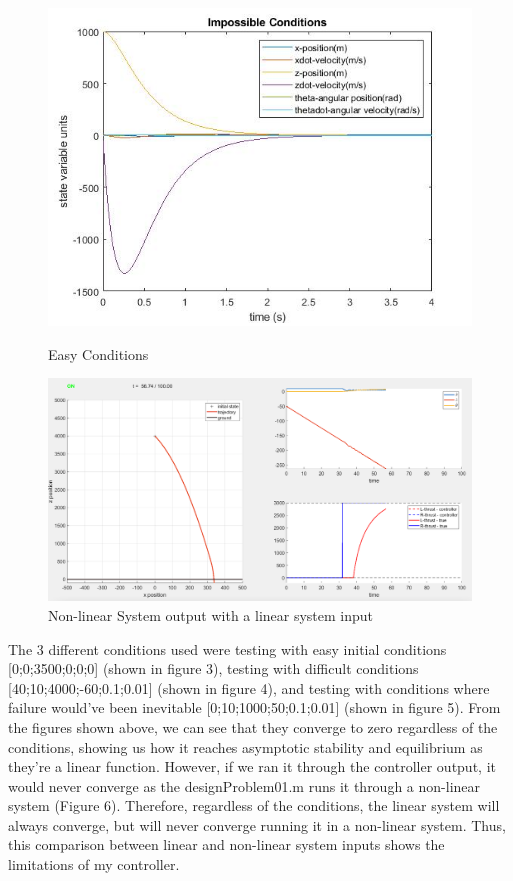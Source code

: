 \documentclass[a4paper,12pt]{article}
\begin{document}
\begin{figure}[H]
\centering
\begin{minipage}{.5\textwidth}
	\centering
	\includegraphics[width=.97\linewidth]{Impossibleconditions.jpg}
	\caption{Easy Conditions}
	\end{minipage}%
\begin{minipage}{.5\textwidth}
	\centering
	\includegraphics[width=.97\linewidth]{Screen Shot 2020-10-07 at 1.34.13 PM.png}
	\caption{Non-linear System output with a linear system input}
\end{minipage}
\end{figure}
The 3 different conditions used were testing with easy initial conditions [0;0;3500;0;0;0] (shown in figure 3), testing with difficult conditions [40;10;4000;-60;0.1;0.01] (shown in figure 4), and testing with conditions where failure would've been inevitable [0;10;1000;50;0.1;0.01] (shown in figure 5). From the figures shown above, we can see that they converge to zero regardless of the conditions, showing us how it reaches asymptotic stability and equilibrium as they're a linear function. However, if we ran it through the controller output, it would never converge as the designProblem01.m runs it through a non-linear system (Figure 6). Therefore, regardless of the conditions, the linear system will always converge, but will never converge running it in a non-linear system. Thus, this comparison between linear and non-linear system inputs shows the limitations of my controller.
\end{document}
